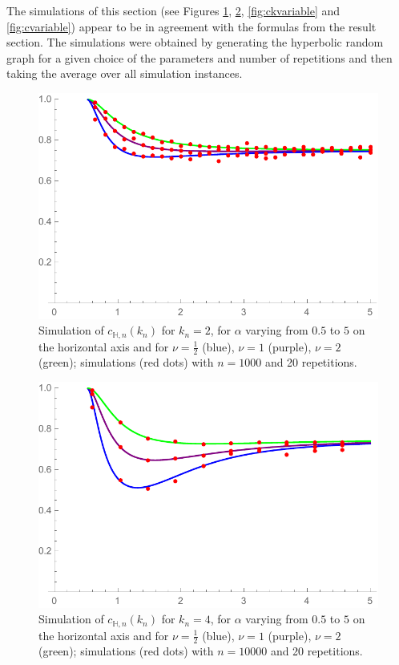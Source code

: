 The simulations of this section (see Figures \ref{fig:c2allnu}, \ref{fig:c4allnu}, \ref{fig:ckvariable} and \ref{fig:cvariable}) appear to be in agreement with the formulas from the result section. The simulations were obtained by generating the hyperbolic random graph for a given choice of the parameters and number of repetitions and then taking the average over all simulation instances.
\begin{figure}
    \centering
    \includegraphics[scale=0.6]{figures/sim0123c2nualln1000rep20.pdf}
    \caption{Simulation of $c_{\mathbb{H},n}(k_n)$ for $k_n= 2$, for $\alpha$ varying from $0.5$ to $5$ on the horizontal axis and for $\nu=\frac{1}{2}$ (blue), $\nu=1$ (purple), $\nu=2$ (green); simulations (red dots) with $n=1000$ and 20 repetitions.}
    \label{fig:c2allnu}
\end{figure}
\begin{figure}
    \centering
    \includegraphics[scale=0.6]{figures/sim0128c4nualln10000rep20.pdf}
    \caption{Simulation of $c_{\mathbb{H},n}(k_n)$ for $k_n= 4$, for $\alpha$ varying from $0.5$ to $5$ on the horizontal axis and for $\nu=\frac{1}{2}$ (blue), $\nu=1$ (purple), $\nu=2$ (green); simulations (red dots) with $n=10 000$ and 20 repetitions.}
    \label{fig:c4allnu}
\end{figure}
